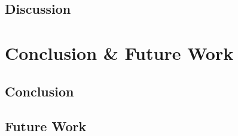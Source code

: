\documentclass{article}
\begin{document}
\subsection{Discussion}

\section{Conclusion {\&} Future Work}

\subsection{Conclusion}
\subsection{Future Work}
\end{document}
